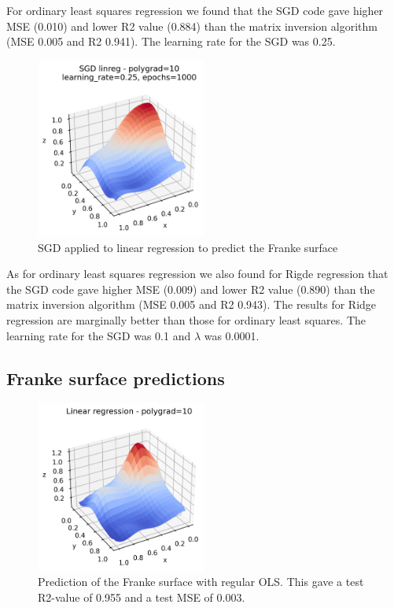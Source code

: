 \documentclass[12pt,a4paper]{article}
\begin{document}
    For ordinary least squares regression we found that the SGD code gave higher MSE (0.010) and lower R2 value (0.884) than the matrix inversion algorithm (MSE 0.005 and R2 0.941). The learning rate for the SGD was 0.25.

    \begin{figure}[H]
        \centering
        \includegraphics[width=0.5\textwidth]{figures/sgd_linreg_constant_surface.png}
        \caption{SGD applied to linear regression to predict the Franke surface}
        \label{fig:surface_OLS_SGD}
    \end{figure}

    As for ordinary least squares regression we also found for Rigde regression that the SGD code gave higher MSE (0.009) and lower R2 value (0.890) than the matrix inversion algorithm (MSE 0.005 and R2 0.943). The results for Ridge regression are marginally better than those for ordinary least squares. The learning rate for the SGD was 0.1 and $\lambda$ was 0.0001.

    \subsection{Franke surface predictions}

    \begin{figure}[H]
        \centering
        \includegraphics[width=0.5\textwidth]{figures/franke_linreg_sufrace.png}
        \caption{Prediction of the Franke surface with regular OLS. This gave a test R2-value of 0.955 and a test MSE of 0.003.}
        \label{fig:linreg_surface}
    \end{figure}
\end{document}
